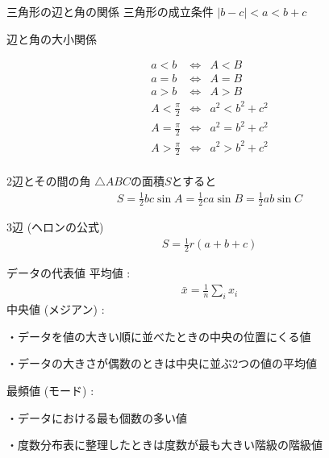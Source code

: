 \documentclass[aspectratio=169, 12pt]{beamer} %
\begin{document}
\begin{frame}{三角形の辺と角の関係}
    三角形の成立条件 $|b-c|<a<b+c$ \par
    辺と角の大小関係 \par
    \begin{eqnarray*}
        a<b &\Leftrightarrow& A<B \\
        a=b &\Leftrightarrow& A=B \\
        a>b &\Leftrightarrow& A>B \\
        A<\frac{\pi}{2} &\Leftrightarrow& a^2<b^2+c^2 \\
        A=\frac{\pi}{2} &\Leftrightarrow& a^2=b^2+c^2 \\
        A>\frac{\pi}{2} &\Leftrightarrow& a^2>b^2+c^2 \\
    \end{eqnarray*}
\end{frame}
\begin{frame}{2辺とその間の角}
    $\bigtriangleup ABC$の面積$S$とすると
    \begin{eqnarray*}
        S=\frac{1}{2}bc\sin A=\frac{1}{2}ca\sin B=\frac{1}{2}ab\sin C
    \end{eqnarray*}
\end{frame}
\begin{frame}{3辺 (ヘロンの公式)}
    \begin{eqnarray*}
        S=\frac{1}{2}r(a+b+c)
    \end{eqnarray*}
\end{frame}
\begin{frame}{データの代表値}
    平均値 :
    \begin{eqnarray*}
        \bar{x}=\frac{1}{n}\sum_i x_i
    \end{eqnarray*}
    中央値 (メジアン) : \par
    ・データを値の大きい順に並べたときの中央の位置にくる値\par
    ・データの大きさが偶数のときは中央に並ぶ2つの値の平均値\par
    最頻値 (モード) : \par
    ・データにおける最も個数の多い値 \par
    ・度数分布表に整理したときは度数が最も大きい階級の階級値
\end{frame}
\end{document}
